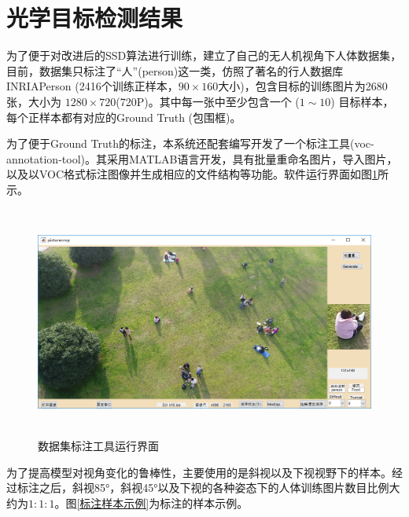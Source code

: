 \section{光学目标检测结果}

为了便于对改进后的SSD算法进行训练，建立了自己的无人机视角下人体数据集，目前，数据集只标注了“人”(person)这一类，仿照了著名的行人数据库INRIAPerson (2416个训练正样本，$90\times160$大小)，包含目标的训练图片为2680张，大小为 $1280\times720$(720P)。其中每一张中至少包含一个 ($1\sim10$) 目标样本，每个正样本都有对应的Ground Truth (包围框)。

为了便于Ground Truth的标注，本系统还配套编写开发了一个标注工具(voc-annotation-tool)。其采用MATLAB语言开发，具有批量重命名图片，导入图片，以及以VOC格式标注图像并生成相应的文件结构等功能。软件运行界面如图\ref{数据集标注工具运行界面}所示。

\begin{figure}[h]
    \centering
    \includegraphics[height=7.62cm]{figures/数据集标注工具运行界面.png}
    \caption{数据集标注工具运行界面}\label{数据集标注工具运行界面}
\end{figure}

为了提高模型对视角变化的鲁棒性，主要使用的是斜视以及下视视野下的样本。经过标注之后，斜视85°，斜视45°以及下视的各种姿态下的人体训练图片数目比例大约为$1:1:1$。图\ref{标注样本示例}为标注的样本示例。

